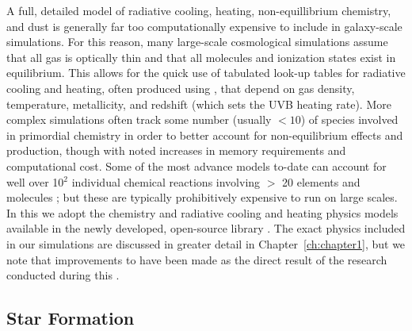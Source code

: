 A full, detailed model of radiative cooling, heating, non-equillibrium chemistry, and dust is generally far too computationally expensive to include in galaxy-scale simulations. For this reason, many large-scale cosmological simulations assume that all gas is optically thin and that all molecules and ionization states exist in equilibrium. This allows for the quick use of tabulated look-up tables for radiative cooling and heating, often produced using  \citep{Cloudy2013}, that depend on gas density, temperature, metallicity, and redshift (which sets the UVB heating rate). More complex simulations often track some number (usually $< 10$) of species involved in primordial chemistry in order to better account for non-equilibrium effects and \Hmolecular production, though with noted increases in memory requirements and computational cost. Some of the most advance models to-date can account for well over 10$^2$ individual chemical reactions involving $>$ 20 elements and molecules \citep[e.g.][]{Richings2016,Richings2018}; but these are typically prohibitively expensive to run on large scales. In this \dissertation we adopt the chemistry and radiative cooling and heating physics models available in the newly developed, open-source library  \citep{GrackleMethod}. The exact physics included in our simulations are discussed in greater detail in Chapter~\ref{ch:chapter1}, but we note that improvements to  have been made as the direct result of the research conducted during this \dissertation.

\subsection{Star Formation} \label{intro:sec:sf}

